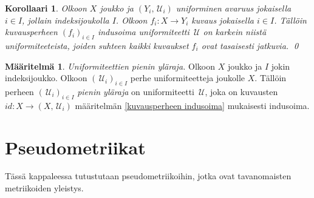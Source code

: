 \documentclass[12pt,a4paper,leqno]{report}
\newcommand{\U}{\,\mathcal{U}}
\theoremstyle{plain}
\newtheorem{kor}[equation]{Korollaari}
\theoremstyle{definition}
\newtheorem{maar}[equation]{Määritelmä}
\theoremstyle{remark}
\begin{document}
\begin{kor}
Olkoon $X$ joukko ja $(Y_i,\U_i)$ uniforminen avaruus jokaisella $i\in I$, jollain indeksijoukolla $I$. 
Olkoon $f_i\colon X\rightarrow Y_i$ kuvaus jokaisella $i\in I$.
Tällöin kuvausperheen $(f_i)_{i\in I}$ indusoima uniformiteetti $\U$ on karkein niistä uniformiteeteista, 
joiden suhteen kaikki kuvaukset $f_i$ ovat tasaisesti jatkuvia.
\qed
%
\end{kor}
\begin{maar}
\emph{Uniformiteettien pienin yläraja.}
Olkoon $X$ joukko ja $I$ jokin indeksijoukko.
Olkoon $(\U_i)_{i\in I}$ perhe uniformiteetteja joukolle $X$.
Tällöin perheen $(\U_i)_{i\in I}$ \emph{pienin yläraja} on uniformiteetti $\U$, joka on kuvausten $id\colon X\rightarrow (X,\U_i)$ määritelmän \ref{kuvausperheen indusoima} mukaisesti indusoima.
\end{maar}
\chapter{Pseudometriikat}
Tässä kappaleessa tutustutaan pseudometriikoihin\cite[luku~IX]{Eom2}, jotka ovat tavanomaisten metriikoiden yleistys. 
\end{document}
